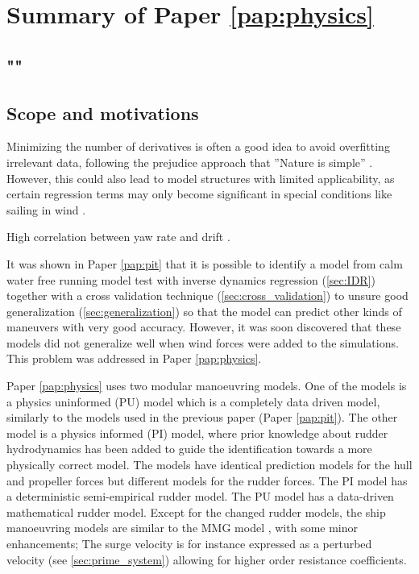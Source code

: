 \section{Summary of Paper \ref{pap:physics}}
\subsection*{""}
\subsection*{Scope and motivations}

\textcolor{ref}{
Minimizing the number of derivatives is often a good idea to avoid overfitting irrelevant data, following the prejudice approach that ''Nature is simple'' \cite{ljung_perspectives_2010}. However, this could also lead to model structures with limited applicability, as certain regression terms may only become significant in special conditions like sailing in wind \cite{abkowitz_measurement_1980}.
}

\textcolor{ref}{
High correlation between yaw rate and drift \cite{yoon_identification_2003}.
}

It was shown in Paper \ref{pap:pit} that it is possible to identify a model from calm water free running model test with inverse dynamics regression (\autoref{sec:IDR}) together with a cross validation technique (\autoref{sec:cross_validation}) to unsure good generalization (\autoref{sec:generalization}) so that the model can predict other kinds of maneuvers with very good accuracy. However, it was soon discovered that these models did not generalize well when wind forces were added to the simulations. This problem was addressed in Paper \ref{pap:physics}.

Paper \ref{pap:physics} uses two modular manoeuvring models. One of the models is a physics uninformed (PU) model which is a completely data driven model, similarly to the models used in the previous paper (Paper \ref{pap:pit}).
The other model is a physics informed (PI) model, where prior knowledge about rudder hydrodynamics has been added to guide the identification towards a more physically correct model. 
The models have identical prediction models for the hull and propeller forces but different models for the rudder forces. The PI model has a deterministic semi-empirical rudder model. The PU model has a data-driven mathematical rudder model. Except for the changed rudder models, the ship manoeuvring models are similar to the MMG model \cite{yasukawa_introduction_2015}, with some minor enhancements; The surge velocity is for instance expressed as a perturbed velocity (see \autoref{sec:prime_system}) allowing for higher order resistance coefficients.

